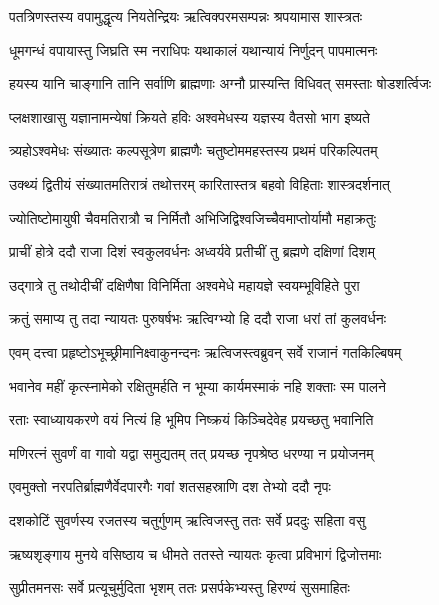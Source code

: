 \twolineshloka
{पतत्रिणस्तस्य वपामुद्धृत्य नियतेन्द्रियः}
{ऋत्विक्परमसम्पन्नः श्रपयामास शास्त्रतः} %

\twolineshloka
{धूमगन्धं वपायास्तु जिघ्रति स्म नराधिपः}
{यथाकालं यथान्यायं निर्णुदन् पापमात्मनः} %

\twolineshloka
{हयस्य यानि चाङ्गानि तानि सर्वाणि ब्राह्मणाः}
{अग्नौ प्रास्यन्ति विधिवत् समस्ताः षोडशर्त्विजः} %

\twolineshloka
{प्लक्षशाखासु यज्ञानामन्येषां क्रियते हविः}
{अश्वमेधस्य यज्ञस्य वैतसो भाग इष्यते} %

\twolineshloka
{त्र्यहोऽश्वमेधः संख्यातः कल्पसूत्रेण ब्राह्मणैः}
{चतुष्टोममहस्तस्य प्रथमं परिकल्पितम्} %

\twolineshloka
{उक्थ्यं द्वितीयं संख्यातमतिरात्रं तथोत्तरम्}
{कारितास्तत्र बहवो विहिताः शास्त्रदर्शनात्} %

\twolineshloka
{ज्योतिष्टोमायुषी चैवमतिरात्रौ च निर्मितौ}
{अभिजिद्विश्वजिच्चैवमाप्तोर्यामौ महाक्रतुः} %

\twolineshloka
{प्राचीं होत्रे ददौ राजा दिशं स्वकुलवर्धनः}
{अध्वर्यवे प्रतीचीं तु ब्रह्मणे दक्षिणां दिशम्} %

\twolineshloka
{उद्गात्रे तु तथोदीचीं दक्षिणैषा विनिर्मिता}
{अश्वमेधे महायज्ञे स्वयम्भूविहिते पुरा} %

\twolineshloka
{क्रतुं समाप्य तु तदा न्यायतः पुरुषर्षभः}
{ऋत्विग्भ्यो हि ददौ राजा धरां तां कुलवर्धनः} %

\twolineshloka
{एवम् दत्त्वा प्रहृष्टोऽभूच्छ्रीमानिक्ष्वाकुनन्दनः}
{ऋत्विजस्त्वब्रुवन् सर्वे राजानं गतकिल्बिषम्} %

\twolineshloka
{भवानेव महीं कृत्स्नामेको रक्षितुमर्हति}
{न भूम्या कार्यमस्माकं नहि शक्ताः स्म पालने} %

\twolineshloka
{रताः स्वाध्यायकरणे वयं नित्यं हि भूमिप}
{निष्क्रयं किञ्चिदेवेह प्रयच्छतु भवानिति} %

\twolineshloka
{मणिरत्नं सुवर्णं वा गावो यद्वा समुद्यतम्}
{तत् प्रयच्छ नृपश्रेष्ठ धरण्या न प्रयोजनम्} %

\twolineshloka
{एवमुक्तो नरपतिर्ब्राह्मणैर्वेदपारगैः}
{गवां शतसहस्राणि दश तेभ्यो ददौ नृपः} %

\twolineshloka
{दशकोटिं सुवर्णस्य रजतस्य चतुर्गुणम्}
{ऋत्विजस्तु ततः सर्वे प्रददुः सहिता वसु} %

\twolineshloka
{ऋष्यशृङ्गाय मुनये वसिष्ठाय च धीमते}
{ततस्ते न्यायतः कृत्वा प्रविभागं द्विजोत्तमाः} %

\twolineshloka
{सुप्रीतमनसः सर्वे प्रत्यूचुर्मुदिता भृशम्}
{ततः प्रसर्पकेभ्यस्तु हिरण्यं सुसमाहितः} %

